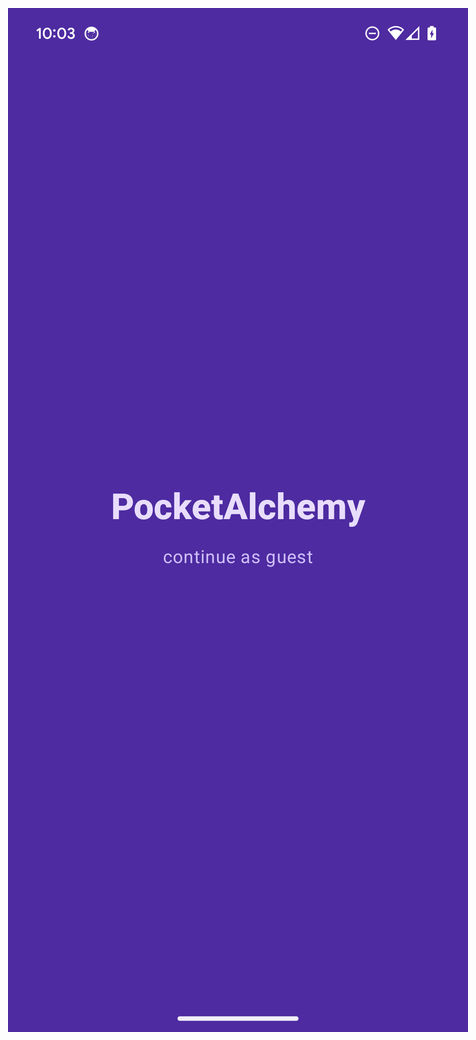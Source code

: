 \documentclass[12pt]{article}
\begin{document}
\begin{center}
\includegraphics[scale=0.175]{../res/img/LoginScreenDark.png}

\end{center}
\end{document}

